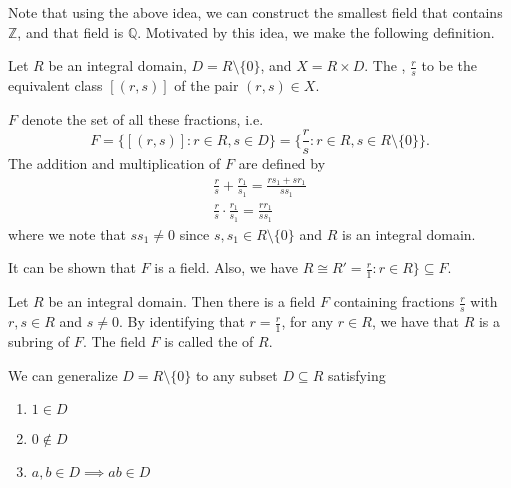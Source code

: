 Note that using the above idea, we can construct the smallest field that contains $\mathbb{Z}$, and that field is $\mathbb{Q}$. Motivated by this idea, we make the following definition.

\begin{defn}[Fraction]
\label{defn:fraction}
  Let $R$ be an integral domain, $D = R \setminus \{0\}$, and $X = R \times D$. The , $\frac{r}{s}$ to be the equivalent class $[(r, s)]$ of the pair $(r, s) \in X$.
\end{defn}

 $F$ denote the set of all these fractions, i.e.
\begin{equation*}
  F = \{ [ (r, s) ] : r \in R, s \in D \} = \{ \frac{r}{s} : r \in R, s \in R \setminus \{0\} \}.
\end{equation*}
The addition and multiplication of $F$ are defined by
\begin{gather*}
  \frac{r}{s} + \frac{r_1}{s_1} = \frac{rs_1 + sr_1}{ss_1} \\
  \frac{r}{s} \cdot \frac{r_1}{s_1} = \frac{rr_1}{ss_1}
\end{gather*}
where we note that $ss_1 \neq 0$ since $s, s_1 \in R \setminus \{0\}$ and $R$ is an integral domain.

It can be shown that $F$ is a field. Also, we have $R \cong R' = \frac{r}{1} : r \in R \} \subseteq F$.

\begin{thm}
\label{thm:field_of_fractions}
  Let $R$ be an integral domain. Then there is a field $F$ containing fractions $\frac{r}{s}$ with $r, s \in R$ and $s \neq 0$. By identifying that $r = \frac{r}{1}$, for any $r \in R$, we have that $R$ is a subring of $F$. The field $F$ is called the  of $R$.
\end{thm}

\begin{note}
  We can generalize $D = R \setminus \{0\}$ to any subset $D \subseteq R$ satisfying
  \begin{enumerate}
    \item $1 \in D$
    \item $0 \notin D$
    \item $a, b \in D \implies ab \in D$
  \end{enumerate}
\end{note}



